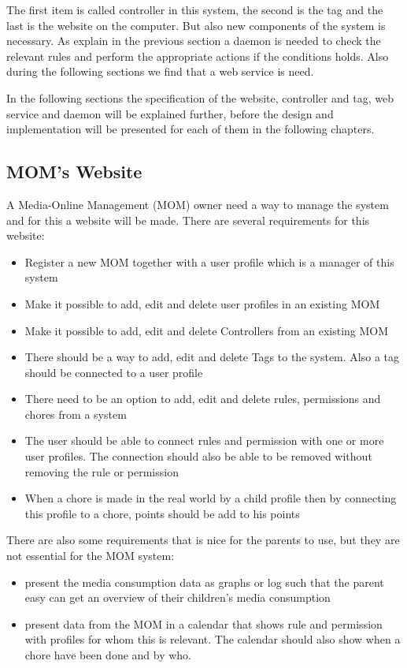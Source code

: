 The first item is called controller in this system, the second is the tag and the last is the website on the computer. But also new components of the system is necessary. As explain in the previous section a daemon is needed to check the relevant rules and perform the appropriate actions if the conditions holds. Also during the following sections we find that a web service is need. 

In the following sections the specification of the website, controller and tag, web service and daemon will be explained further, before the design and implementation will be presented for each of them in the following chapters.  

\subsection{MOM's Website}
A Media-Online Management (MOM) owner need a way to manage the system and for this a website will be made. There are several requirements for this website:

\begin{itemize}
	\item Register a new MOM together with a user profile which is a manager of this system
	\item Make it possible to add, edit and delete user profiles in an existing MOM 
	\item Make it possible to add, edit and delete Controllers from an existing MOM
	\item There should be a way to add, edit and delete Tags to the system. Also a tag should be connected to a user profile
	\item There need to be an option to add, edit and delete rules, permissions and chores from a system
	\item The user should be able to connect rules and permission with one or more user profiles. The connection should also be able to be removed without removing the rule or permission
	\item When a chore is made in the real world by a child profile then by connecting this profile to a chore, points should be add to his points
\end{itemize}

There are also some requirements that is nice for the parents to use, but they are not essential for the MOM system:

\begin{itemize}
	\item present the media consumption data as graphs or log such that the parent easy can get an overview of their children's media consumption 
	\item present data from the MOM in a calendar that shows rule and permission with profiles for whom this is relevant. The calendar should also show when a chore have been done and by who.
\end{itemize}


